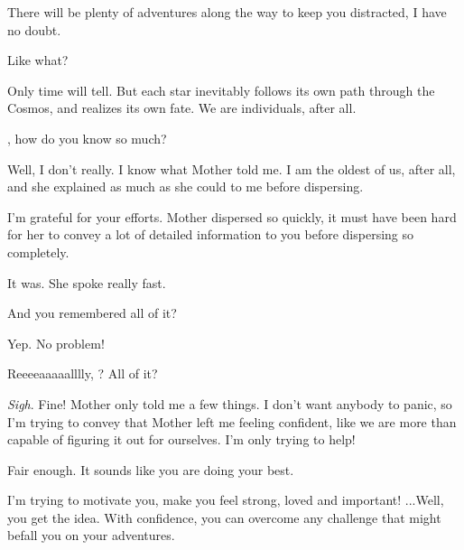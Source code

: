 \documentclass[main.tex]{subfiles}
\begin{document}
\par \Maia There will be plenty of adventures along the way to keep you distracted, I have no doubt.

\par \Sterope  Like what?  

\par \Maia Only time will tell.  But each star inevitably follows its own path through the Cosmos, and realizes its own fate.  We are individuals, after all.

\par \Sterope \rmmaia, how do you know so much?

\par \Maia Well, I don't really. I know what Mother told me.  I am the oldest of us, after all, and she explained as much as she could to me before dispersing.  

\par \Sterope I'm grateful for your efforts.  Mother dispersed so quickly, it must have been hard for her to convey a lot of detailed information to you before dispersing so completely.

\par \Maia It was.  She spoke really fast.

\par \Sterope And you remembered all of it?

\par \Maia Yep.  No problem!  

\par \Sterope Reeeeaaaaalllly, \rmmaia?  All of it?

\par \Maia \textit{Sigh}.  Fine!  Mother only told me a few things.  I don't want anybody to panic, so I'm trying to convey that Mother left me feeling confident, like we are more than capable of figuring it out for ourselves.  I'm only trying to help!  

\par \Sterope Fair enough.  It sounds like you are doing your best.

\par \Maia I'm trying to motivate you, make you feel strong, loved and important!  ...Well, you get the idea.  With confidence, you can overcome any challenge that might befall you on your adventures.
\end{document}
